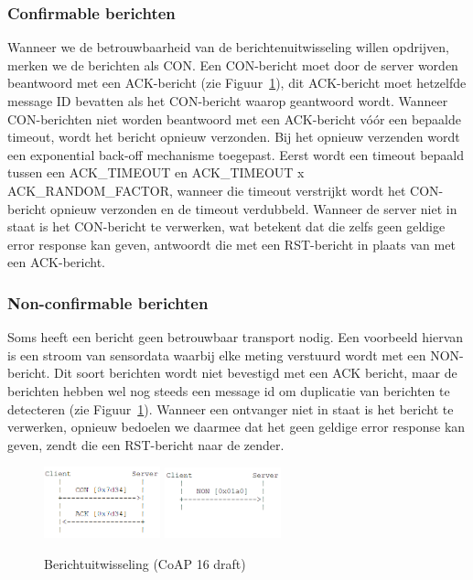 \subsubsection{Confirmable berichten}

Wanneer we de betrouwbaarheid van de berichtenuitwisseling willen opdrijven, merken we de berichten als CON. Een CON-bericht moet door de server worden beantwoord met een ACK-bericht (zie Figuur~\ref{fig:berichtuitwisseling}), dit ACK-bericht moet hetzelfde message ID bevatten als het CON-bericht waarop geantwoord wordt. Wanneer CON-berichten niet worden beantwoord met een ACK-bericht v\'{o}\'{o}r een bepaalde timeout, wordt het bericht opnieuw verzonden. Bij het opnieuw verzenden wordt een exponential back-off mechanisme toegepast. Eerst wordt een timeout bepaald tussen een ACK\_TIMEOUT en ACK\_TIMEOUT x ACK\_RANDOM\_FACTOR, wanneer die timeout verstrijkt wordt het CON-bericht opnieuw verzonden en de timeout verdubbeld. Wanneer de server niet in staat is het CON-bericht te verwerken, wat betekent dat die zelfs geen geldige error response kan geven, antwoordt die met een RST-bericht in plaats van met een ACK-bericht.

\subsubsection{Non-confirmable berichten}

Soms heeft een bericht geen betrouwbaar transport nodig. Een voorbeeld hiervan is een stroom van sensordata waarbij elke meting verstuurd wordt met een NON-bericht. Dit soort berichten wordt niet bevestigd met een ACK bericht, maar de berichten hebben wel nog steeds een message id om duplicatie van berichten te detecteren (zie Figuur~\ref{fig:berichtuitwisseling}). Wanneer een ontvanger niet in staat is het bericht te verwerken, opnieuw bedoelen we daarmee dat het geen geldige error response kan geven, zendt die een RST-bericht naar de zender.

\begin{figure}[h]
\vspace{10pt}
\centering
{}
{\includegraphics[width=0.3\textwidth]{fig/CoAPConfirmable}}
\hspace{30pt}
{\includegraphics[width=0.3\textwidth]{fig/CoAPNonConfirmable}}
\caption{Berichtuitwisseling (CoAP 16 draft)}
\label{fig:berichtuitwisseling}
\end{figure}

